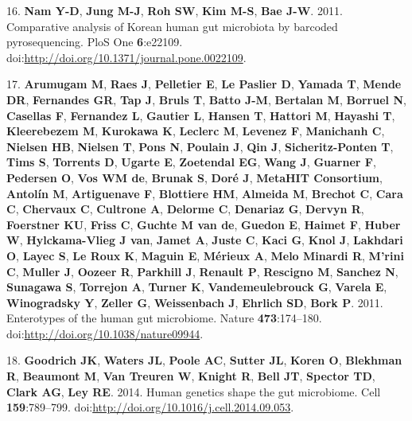 \documentclass[12pt,]{article}
\begin{document}
16. \textbf{Nam Y-D}, \textbf{Jung M-J}, \textbf{Roh SW}, \textbf{Kim
M-S}, \textbf{Bae J-W}. 2011. Comparative analysis of Korean human gut
microbiota by barcoded pyrosequencing. PloS One \textbf{6}:e22109.
doi:\url{http://doi.org/10.1371/journal.pone.0022109}.

17. \textbf{Arumugam M}, \textbf{Raes J}, \textbf{Pelletier E},
\textbf{Le Paslier D}, \textbf{Yamada T}, \textbf{Mende DR},
\textbf{Fernandes GR}, \textbf{Tap J}, \textbf{Bruls T}, \textbf{Batto
J-M}, \textbf{Bertalan M}, \textbf{Borruel N}, \textbf{Casellas F},
\textbf{Fernandez L}, \textbf{Gautier L}, \textbf{Hansen T},
\textbf{Hattori M}, \textbf{Hayashi T}, \textbf{Kleerebezem M},
\textbf{Kurokawa K}, \textbf{Leclerc M}, \textbf{Levenez F},
\textbf{Manichanh C}, \textbf{Nielsen HB}, \textbf{Nielsen T},
\textbf{Pons N}, \textbf{Poulain J}, \textbf{Qin J},
\textbf{Sicheritz-Ponten T}, \textbf{Tims S}, \textbf{Torrents D},
\textbf{Ugarte E}, \textbf{Zoetendal EG}, \textbf{Wang J},
\textbf{Guarner F}, \textbf{Pedersen O}, \textbf{Vos WM de},
\textbf{Brunak S}, \textbf{Doré J}, \textbf{MetaHIT Consortium},
\textbf{Antolín M}, \textbf{Artiguenave F}, \textbf{Blottiere HM},
\textbf{Almeida M}, \textbf{Brechot C}, \textbf{Cara C},
\textbf{Chervaux C}, \textbf{Cultrone A}, \textbf{Delorme C},
\textbf{Denariaz G}, \textbf{Dervyn R}, \textbf{Foerstner KU},
\textbf{Friss C}, \textbf{Guchte M van de}, \textbf{Guedon E},
\textbf{Haimet F}, \textbf{Huber W}, \textbf{Hylckama-Vlieg J van},
\textbf{Jamet A}, \textbf{Juste C}, \textbf{Kaci G}, \textbf{Knol J},
\textbf{Lakhdari O}, \textbf{Layec S}, \textbf{Le Roux K},
\textbf{Maguin E}, \textbf{Mérieux A}, \textbf{Melo Minardi R},
\textbf{M'rini C}, \textbf{Muller J}, \textbf{Oozeer R},
\textbf{Parkhill J}, \textbf{Renault P}, \textbf{Rescigno M},
\textbf{Sanchez N}, \textbf{Sunagawa S}, \textbf{Torrejon A},
\textbf{Turner K}, \textbf{Vandemeulebrouck G}, \textbf{Varela E},
\textbf{Winogradsky Y}, \textbf{Zeller G}, \textbf{Weissenbach J},
\textbf{Ehrlich SD}, \textbf{Bork P}. 2011. Enterotypes of the human gut
microbiome. Nature \textbf{473}:174--180.
doi:\url{http://doi.org/10.1038/nature09944}.

18. \textbf{Goodrich JK}, \textbf{Waters JL}, \textbf{Poole AC},
\textbf{Sutter JL}, \textbf{Koren O}, \textbf{Blekhman R},
\textbf{Beaumont M}, \textbf{Van Treuren W}, \textbf{Knight R},
\textbf{Bell JT}, \textbf{Spector TD}, \textbf{Clark AG}, \textbf{Ley
RE}. 2014. Human genetics shape the gut microbiome. Cell
\textbf{159}:789--799.
doi:\url{http://doi.org/10.1016/j.cell.2014.09.053}.
\end{document}
